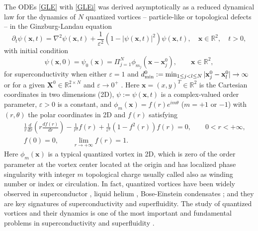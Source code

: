 \documentclass{aims}
\theoremstyle{plain}
\theoremstyle{definition}
\newcommand{\bx}{{\mathbf x}}
\newcommand{\bX}{{\mathbf X}}
\newcommand{\be} {\begin{equation}}
\newcommand{\ee}{\end{equation}}
\newcommand{\beas}{\begin{eqnarray*}}
\newcommand{\eeas}{\end{eqnarray*} }
\begin{document}
The ODEs \eqref{GLE} with \eqref{GLEi} was derived asymptotically
as a reduced dynamical law
for the dynamics of $N$ quantized vortices -- particle-like
or topological defects -- in the
Ginzburg-Landau equation \cite{Neu1,Jerrard,Lin96}
\be\label{pgl}
\partial_t \psi(\mathbf x,t)
=\nabla^2\psi(\mathbf x,
t)+\frac{1}{\varepsilon^2}(1-|\psi(\mathbf x,
t)|^2)\psi(\mathbf x,t), \quad \mathbf x\in\mathbb{R}^2,\quad t>0,
\ee
with initial condition
\be\label{pgli}
\psi(\mathbf x,0)=\psi_0(\mathbf x)=\Pi_{j=1}^N \phi_{m_j}(\bx-\bx_j^0), \qquad \mathbf
x\in\mathbb{R}^2,
\ee
for superconductivity when either $\varepsilon=1$ and $d_{\rm min}^0:=\min_{1\le j<l\le N}|\bx_j^0-\bx_l^0|\to \infty$ \cite{Neu2} or
for a given $\bX^0\in {\mathbb R}_*^{2\times N}$ and $\varepsilon\to 0^+$ \cite{Jerrard,Lin96}.
Here $\mathbf x=(x,y)^T\in\mathbb R^2$ is the Cartesian
coordinates in two dimensions (2D), $\psi:=\psi(\mathbf x, t)$ is a complex-valued
order parameter, $\varepsilon>0$ is a constant, and $\phi_{m}(\bx)=f(r)e^{im\theta}$ ($m=+1$ or $-1$) with $(r,\theta)$ the polar coordinates
in 2D and $f(r)$ satisfying \cite{Neu2,Jerrard,Lin96,Zhang1,Zhang2}
\beas
&&\frac{1}{r}\frac{d}{dr}\left(r\frac{df(r)}{dr}\right)-\frac{1}{r^2}f(r)
+\frac{1}{\varepsilon^2}(1-f^2(r))f(r)=0, \qquad 0<r<+\infty,\\
&&f(0)=0, \qquad \lim_{r\to +\infty} f(r)=1.
\eeas
Here $\phi_{m}(\bx)$ is a typical quantized vortex in 2D,
which is zero of the order parameter at the
vortex center located at the origin and has localized phase
singularity with integer $m$ topological charge usually
called also as winding number or index or circulation.
In fact, quantized
vortices have been widely observed in superconductor \cite{E,Lin96,Bao2},
liquid helium \cite{Newton}, Bose-Einstein condensates \cite{Pit,Bao0,Klein};
and they are key signatures of superconductivity and superfluidity.
The study of quantized vortices and their dynamics is one of the
most important and fundamental problems in superconductivity and
superfluidity \cite{Neu2,Bao1,Mironescu,Sandier,Bauman,Chapman,Colliander,Du,
Lange,Lin98,Bao3,Ovchinnikov1,Ovchinnikov2}.
\end{document}
